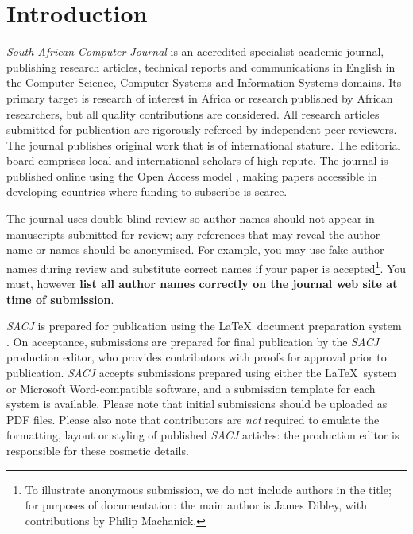 \documentclass{article}
\begin{document}

\SACJmaketitle

\section{Introduction}
{\em South African Computer Journal} is an accredited specialist academic journal, publishing research articles, technical reports and communications in English in the Computer Science, Computer Systems and Information Systems domains. Its primary target is research of interest in Africa or research published by African researchers, but all quality contributions are considered. All research articles submitted for publication are rigorously refereed by independent peer reviewers. The journal publishes original work that is of international stature. The editorial board comprises local and international scholars of high repute. The journal is published online using the Open Access
model \cite{laakso2011development}, making papers accessible in developing countries where funding to subscribe is scarce.

The journal uses double-blind review so author names should not appear in manuscripts submitted for review; any references that may reveal the author name or names should be anonymised. For example, you may use fake author names during review and substitute correct names if your paper is accepted\footnote{To illustrate anonymous submission, we do not include authors in the title; for purposes of documentation: the main author is James Dibley, with contributions by Philip Machanick.}. You must, however \textbf{list all
author names correctly on the journal web site at time of submission}.

{\em SACJ} is prepared for publication using the \LaTeX~document preparation system \cite{kopka1995guide}. On acceptance, submissions are prepared for final publication by the {\em SACJ} production editor, who provides contributors with proofs for approval prior to publication. {\em SACJ} accepts submissions prepared using either the \LaTeX~system or Microsoft Word-compatible software, and a submission template for each system is available. Please note that initial submissions should be uploaded as PDF files. Please also note that contributors are \emph{not} required to emulate the formatting, layout or styling of published {\em SACJ} articles: the production editor is responsible for these cosmetic details.
\end{document}
